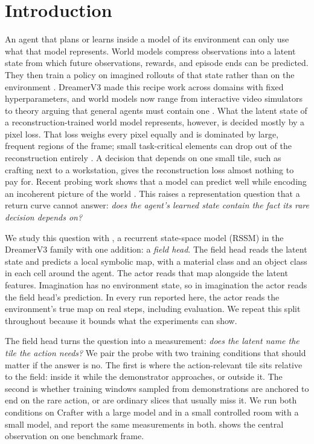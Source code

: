 \section{Introduction}
\label{sec:intro}

An agent that plans or learns inside a model of its environment can only use what that model represents.
World models compress observations into a latent state from which future observations, rewards, and episode ends can be predicted. They then train a policy on imagined rollouts of that state rather than on the environment \citep{ha2018worldmodels,hafner2019planet,hafner2020dreamer}.
DreamerV3 \citep{hafner2023dreamerv3,hafner2025dreamerv3nature} made this recipe work across domains with fixed hyperparameters, and world models now range from interactive video simulators \citep{bruce2024genie,hafner2025dreamer4} to theory arguing that general agents must contain one \citep{richens2025general}.
What the latent state of a reconstruction-trained world model represents, however, is decided mostly by a pixel loss.
That loss weighs every pixel equally and is dominated by large, frequent regions of the frame; small task-critical elements can drop out of the reconstruction entirely \citep{burchi2024mudreamer}.
A decision that depends on one small tile, such as crafting next to a workstation, gives the reconstruction loss almost nothing to pay for.
Recent probing work shows that a model can predict well while encoding an incoherent picture of the world \citep{vafa2024evaluating,gonzalezlaiz2026limits}.
This raises a representation question that a return curve cannot answer: \emph{does the agent's learned state contain the fact its rare decision depends on?}

We study this question with \method{}, a recurrent state-space model (RSSM) in the DreamerV3 family with one addition: a \emph{field head}.
The field head reads the latent state and predicts a local symbolic map, with a material class and an object class in each cell around the agent.
The actor reads that map alongside the latent features.
Imagination has no environment state, so in imagination the actor reads the field head's prediction.
In every run reported here, the actor reads the environment's true map on real steps, including evaluation.
We repeat this split throughout because it bounds what the experiments can show.

The field head turns the question into a measurement: \emph{does the latent name the tile the action needs?}
We pair the probe with two training conditions that should matter if the answer is no.
The first is where the action-relevant tile sits relative to the field: inside it while the demonstrator approaches, or outside it.
The second is whether training windows sampled from demonstrations are anchored to end on the rare action, or are ordinary slices that usually miss it.
We run both conditions on Crafter \citep{hafner2022crafter} with a large model and in a small controlled room with a small model, and report the same measurements in both.
 shows the central observation on one benchmark frame.

